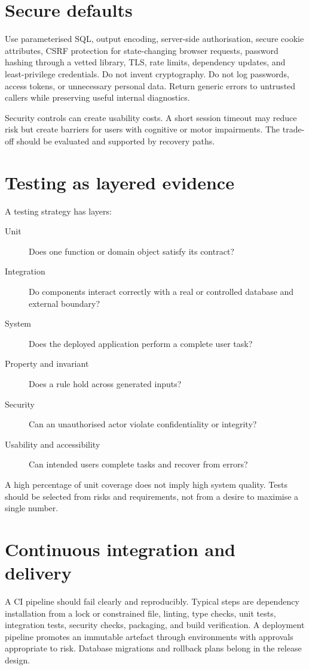 \section{Secure defaults}
Use parameterised SQL, output encoding, server-side authorisation, secure cookie attributes, CSRF protection for state-changing browser requests, password hashing through a vetted library, TLS, rate limits, dependency updates, and least-privilege credentials. Do not invent cryptography. Do not log passwords, access tokens, or unnecessary personal data. Return generic errors to untrusted callers while preserving useful internal diagnostics.

Security controls can create usability costs. A short session timeout may reduce risk but create barriers for users with cognitive or motor impairments. The trade-off should be evaluated and supported by recovery paths.

\section{Testing as layered evidence}
A testing strategy has layers:
\begin{description}
\item[Unit] Does one function or domain object satisfy its contract?
\item[Integration] Do components interact correctly with a real or controlled database and external boundary?
\item[System] Does the deployed application perform a complete user task?
\item[Property and invariant] Does a rule hold across generated inputs?
\item[Security] Can an unauthorised actor violate confidentiality or integrity?
\item[Usability and accessibility] Can intended users complete tasks and recover from errors?
\end{description}
A high percentage of unit coverage does not imply high system quality. Tests should be selected from risks and requirements, not from a desire to maximise a single number.

\section{Continuous integration and delivery}
A CI pipeline should fail clearly and reproducibly. Typical steps are dependency installation from a lock or constrained file, linting, type checks, unit tests, integration tests, security checks, packaging, and build verification. A deployment pipeline promotes an immutable artefact through environments with approvals appropriate to risk. Database migrations and rollback plans belong in the release design.

